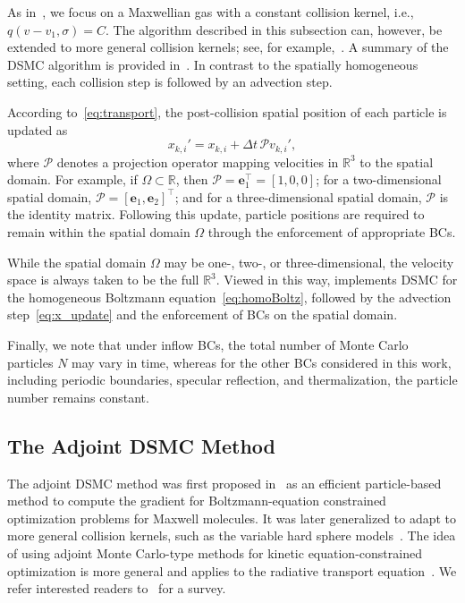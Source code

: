 \documentclass[12pt,nopreprintline]{elsarticle}
\begin{document}
As in~\cite{caflisch2021adjoint}, we focus on a Maxwellian gas with a constant collision kernel, i.e., $ q(v-v_1,\sigma)=C $. The algorithm described in this subsection can, however, be extended to more general collision kernels; see, for example,~\cite{bird1970direct,pareschi2001introduction}. A summary of the DSMC algorithm is provided in~. In contrast to the spatially homogeneous setting, each collision step is followed by an advection step.

According to~\eqref{eq:transport}, the post-collision spatial position of each particle is updated as
\begin{equation}
\label{eq:x_update}
x_{k,i}' = x_{k,i} + \Delta t\,\mathcal P v_{k,i}',
\end{equation}
where $\mathcal P$ denotes a projection operator mapping velocities in $\mathbb R^3$ to the spatial domain. For example, if $\Omega\subset\mathbb R$, then $\mathcal P=\mathbf e_1^\top=[1,0,0]$; for a two-dimensional spatial domain, $\mathcal P=[\mathbf e_1,\mathbf e_2]^\top$; and for a three-dimensional spatial domain, $\mathcal P$ is the identity matrix. Following this update, particle positions are required to remain within the spatial domain $\Omega$ through the enforcement of appropriate BCs.

While the spatial domain $\Omega$ may be one-, two-, or three-dimensional, the velocity space is always taken to be the full $\mathbb R^3$. Viewed in this way,  implements DSMC for the homogeneous Boltzmann equation~\eqref{eq:homoBoltz}, followed by the advection step~\eqref{eq:x_update} and the enforcement of BCs on the spatial domain.

Finally, we note that under inflow BCs, the total number of Monte Carlo particles $N$ may vary in time, whereas for the other BCs considered in this work, including periodic boundaries, specular reflection, and thermalization, the particle number remains constant.

\subsection{The Adjoint DSMC Method}\label{sec:adjoint_DSMC}
The adjoint DSMC method was first proposed in~\cite{caflisch2021adjoint} as an efficient particle-based method to compute the gradient for Boltzmann-equation constrained optimization problems for Maxwell molecules. It was later generalized to adapt to more general collision kernels, such as the variable hard sphere models~\cite{yang2023adjoint}. The idea of using adjoint Monte Carlo-type methods for kinetic equation-constrained optimization is more general and applies to the radiative transport equation~\cite{li2022monte}. We refer interested readers to~\cite{caflisch2024adjoint} for a survey.
\end{document}
